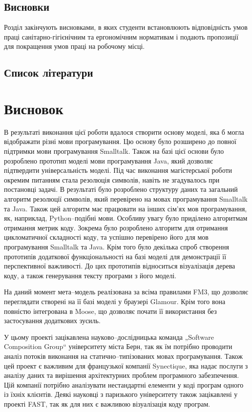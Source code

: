 \documentclass[12pt,a4paper]{article}
\begin{document}
\subsection{Висновки}
Розділ закінчують висновками, в яких студенти встановлюють відповідність умов праці санітарно-гігієнічним та ергономічним нормативам і подають пропозиції для покращення умов праці на робочому місці. 


\subsection{Список літератури}

\clearpage

\section{Висновок}
В результаті виконання цієї роботи вдалося створити основу моделі, яка б могла відображати різні мови програмування. Цю основу було розширено до повної підтримки мови програмування Smalltalk. Також на базі цієї основи було розроблено прототип моделі мови програмування Java, який дозволяє підтвердити універсальність моделі. Під час виконання магістерської роботи окремим питанням стала резолюція символів, навіть не згадувалось при постановці задачі. В результаті було розроблено структуру даних та загальний алгоритм резолюції символів, який перевірено на мовах програмування Smalltalk та Java. Також цей алгоритм має працювати на інших сім'ях мов програмування, як, наприклад, Python--подібні мови. Особливу увагу було приділено алгоритмам отримання метрик коду. Зокрема було розроблено алгоритм для отримання цикломатичної складності коду, та успішно перевірено його для мов програмування Smalltalk та Java. Крім того було декілька спроб створення прототипів додаткової функціональності на базі моделі для демонстрації її перспективної важливості. До цих прототипів відноситься візуалізація дерева коду, а також генерування тексту програми з його моделі.

На даний момент мета--модель реалізована за всіма правилами FM3, що дозволяє переглядати створені на її базі моделі у браузері Glamour. Крім того вона повністю інтегрована в Moose, що дозволяє почати її використання без застосування додаткових зусиль.

У цьому проекті зацікавлена науково--дослідницька команда „Software Composition Group“ університету міста Берн, так як їм потрібно проводити аналіз потоків виконання на статично--типізованих мовах програмування. Також цей проект є важливим для французької компанії Synectique, яка надає послуги з аналізу даних та вирішення архітектурних проблем програмного забезпечення. Цій компанії потрібно аналізувати нестандартні елементи у коді програм одного із їхніх клієнтів. Деякі науковці з паризького університету також зацікавлені у проекті FAST, так як для них є важливою візуалізація коду програм.
\end{document}
